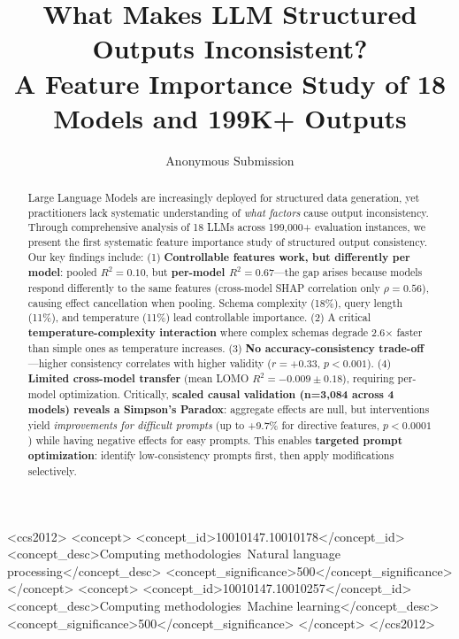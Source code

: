 \documentclass[sigconf,anonymous,review]{acmart}
\begin{document}
\title{What Makes LLM Structured Outputs Inconsistent? \\A Feature Importance Study of 18 Models and 199K+ Outputs}

\author{Anonymous Submission}

\begin{abstract}
Large Language Models are increasingly deployed for structured data generation, yet practitioners lack systematic understanding of \textit{what factors} cause output inconsistency. Through comprehensive analysis of 18 LLMs across 199,000+ evaluation instances, we present the first systematic feature importance study of structured output consistency. Our key findings include: (1) \textbf{Controllable features work, but differently per model}: pooled $R^2=0.10$, but \textbf{per-model $R^2=0.67$}---the gap arises because models respond differently to the same features (cross-model SHAP correlation only $\rho=0.56$), causing effect cancellation when pooling. Schema complexity (18\%), query length (11\%), and temperature (11\%) lead controllable importance. (2) A critical \textbf{temperature-complexity interaction} where complex schemas degrade 2.6$\times$ faster than simple ones as temperature increases. (3) \textbf{No accuracy-consistency trade-off}---higher consistency correlates with higher validity ($r=+0.33$, $p<0.001$). (4) \textbf{Limited cross-model transfer} (mean LOMO $R^2=-0.009 \pm 0.18$), requiring per-model optimization. Critically, \textbf{scaled causal validation (n=3,084 across 4 models) reveals a Simpson's Paradox}: aggregate effects are null, but interventions yield \textit{improvements for difficult prompts} (up to +9.7\% for directive features, $p<0.0001$) while having negative effects for easy prompts. This enables \textbf{targeted prompt optimization}: identify low-consistency prompts first, then apply modifications selectively.
\end{abstract}

\begin{CCSXML}
<ccs2012>
<concept>
<concept_id>10010147.10010178</concept_id>
<concept_desc>Computing methodologies~Natural language processing</concept_desc>
<concept_significance>500</concept_significance>
</concept>
<concept>
<concept_id>10010147.10010257</concept_id>
<concept_desc>Computing methodologies~Machine learning</concept_desc>
<concept_significance>500</concept_significance>
</concept>
</ccs2012>
\end{CCSXML}

\end{document}
